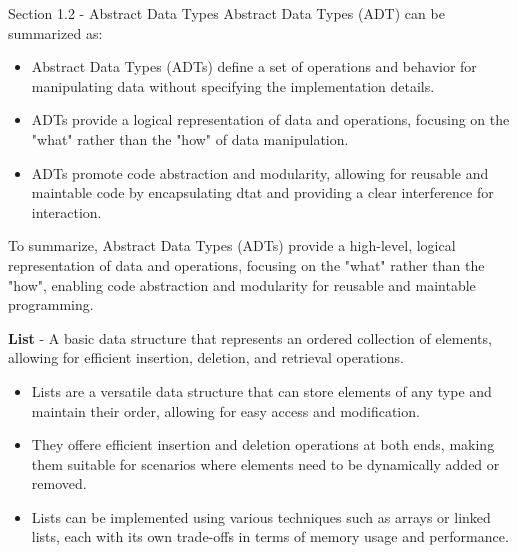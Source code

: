 \begin{notes}{Section 1.2 - Abstract Data Types}
    Abstract Data Types (ADT) can be summarized as:

    \begin{itemize}
        \item Abstract Data Types (ADTs) define a set of operations and behavior for manipulating data without specifying the implementation details.
        \item ADTs provide a logical representation of data and operations, focusing on the "what" rather than the "how" of data manipulation.
        \item ADTs promote code abstraction and modularity, allowing for reusable and maintable code by encapsulating dtat and providing a clear interference for interaction.
    \end{itemize}
    
    To summarize, Abstract Data Types (ADTs) provide a high-level, logical representation of data and operations, focusing on the "what" rather than the "how", enabling
    code abstraction and modularity for reusable and maintable programming.

    \begin{highlight}[List]
        \textbf{List} - A basic data structure that represents an ordered collection of elements, allowing for efficient insertion, deletion, and retrieval operations.
        \begin{itemize}
            \item Lists are a versatile data structure that can store elements of any type and maintain their order, allowing for easy access and modification.
            \item They offere efficient insertion and deletion operations at both ends, making them suitable for scenarios where elements need to be dynamically added or removed.
            \item Lists can be implemented using various techniques such as arrays or linked lists, each with its own trade-offs in terms of memory usage and performance.
        \end{itemize}
    \end{highlight}


\end{notes}
